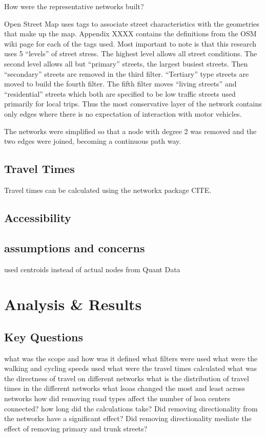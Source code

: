 \documentclass[11pt]{article} %
\begin{document}
How were the representative networks built? 

Open Street Map uses tags to associate street characteristics with the geometries that make up the map. Appendix XXXX contains the definitions from the OSM wiki page for each of the tags used. Most important to note is that this research uses 5 ``levels'' of street stress. The highest level allows all street conditions. The second level allows all but ``primary'' streets, the largest busiest streets. Then ``secondary'' streets are removed in the third filter. ``Tertiary'' type streets are moved to build the fourth filter. The fifth filter moves ``living streets'' and ``residential'' streets which both are specified to be low traffic streets used primarily for local trips. Thus the most conservative layer of the network contains only edges where there is no expectation of interaction with motor vehicles. 

The networks were simplified so that a node with degree 2 was removed and the two edges were joined, becoming a continuous path way. 

\subsection{Travel Times}

Travel times can be calculated using the networkx package CITE. 

\subsection{Accessibility}

\subsection{assumptions and concerns}

used centroids instead of actual nodes from Quant Data


\section{Analysis \& Results}

\subsection{Key Questions}
what was the scope and how was it defined
what filters were used
what were the walking and cycling speeds used
what were the travel times calculated
what was the directness of travel on different networks
what is the distribution of travel times in the different networks
what lsoas changed the most and least across networks
how did removing road types affect the number of lsoa centers connected?
how long did the calculations take?
Did removing directionality from the networks have a significant effect?
Did removing directionality mediate the effect of removing primary and trunk streets?
\end{document}
